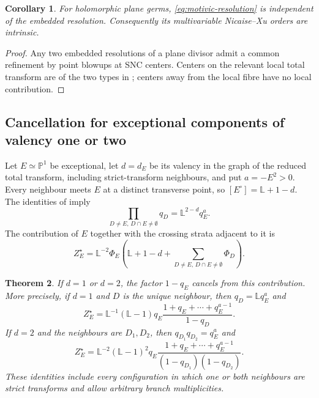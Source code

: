 \documentclass[12pt]{amsart}
\numberwithin{equation}{section}
\theoremstyle{plain}
\newtheorem{theorem}{Theorem}[section]
\newtheorem{corollary}[theorem]{Corollary}
\theoremstyle{definition}
\theoremstyle{remark}
\theoremstyle{definition}
\newcommand{\Lef}{\mathbb L}
\begin{document}
\begin{corollary}\label{cor:motivic-resolution-independent}
For holomorphic plane germs, \eqref{eq:motivic-resolution} is independent of the embedded resolution. Consequently its multivariable Nicaise--Xu orders are intrinsic.
\end{corollary}

\begin{proof}
Any two embedded resolutions of a plane divisor admit a common refinement by point blowups at SNC centers. Centers on the relevant local total transform are of the two types in ; centers away from the local fibre have no local contribution.
\end{proof}

\subsection{Cancellation for exceptional components of valency one or two}

Let $E\simeq\mathbb P^1$ be exceptional, let $d=d_E$ be its valency in the graph of the reduced total transform, including strict-transform neighbours, and put $a=-E^2>0$. Every neighbour meets $E$ at a distinct transverse point, so $[E^\circ]=\Lef+1-d$. The identities of  imply
\begin{equation}\label{eq:motivic-neighbor-product}
 \prod_{D\neq E,\, D\cap E\neq \emptyset}q_D=\Lef^{2-d}q_E^a.
\end{equation}
The contribution of $E$ together with the crossing strata adjacent to it is
\begin{equation}\label{eq:motivic-complete-star}
 Z_E^\star=\Lef^{-2}\Phi_E\left(\Lef+1-d+\sum_{D\neq E,\, D\cap E\neq \emptyset}\Phi_D\right).
\end{equation}

\begin{theorem}\label{thm:motivic-nonrupture-cancellation}
If $d=1$ or $d=2$, the factor $1-q_E$ cancels from this contribution. More precisely, if $d=1$ and $D$ is the unique neighbour, then $q_D=\Lef q_E^a$ and
\begin{equation}\label{eq:motivic-valency-one-factorization}
 Z_E^\star=\Lef^{-1}(\Lef-1)q_E\frac{1+q_E+\cdots+q_E^{a-1}}{1-q_D}.
\end{equation}
If $d=2$ and the neighbours are $D_1,D_2$, then $q_{D_1}q_{D_2}=q_E^a$ and
\begin{equation}\label{eq:motivic-valency-two-factorization}
 Z_E^\star=\Lef^{-2}(\Lef-1)^2q_E\frac{1+q_E+\cdots+q_E^{a-1}}{(1-q_{D_1})(1-q_{D_2})}.
\end{equation}
These identities include every configuration in which one or both neighbours are strict transforms and allow arbitrary branch multiplicities.
\end{theorem}
\end{document}
